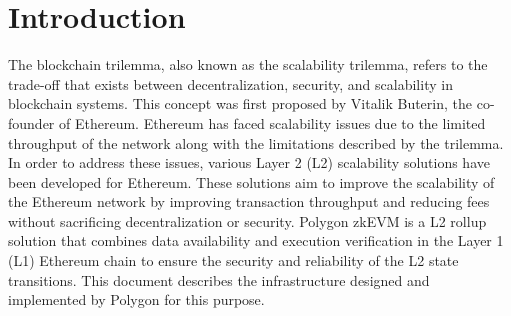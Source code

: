\section{Introduction}

The blockchain trilemma, also known as the scalability trilemma, refers to the trade-off that exists between decentralization, security, and scalability in blockchain systems. This concept was first proposed by Vitalik Buterin, the co-founder of Ethereum. Ethereum has faced scalability issues due to the limited throughput of the network along with the limitations described by the trilemma. In order to address these issues, various Layer 2 (L2) scalability solutions have been developed for Ethereum. These solutions aim to improve the scalability of the Ethereum network by improving transaction throughput and reducing fees without sacrificing decentralization or security. Polygon zkEVM is a L2 rollup solution that combines data availability and execution verification in the Layer 1 (L1) Ethereum chain to ensure the security and reliability of the L2 state transitions. This document describes the infrastructure designed and implemented by Polygon for this purpose.


